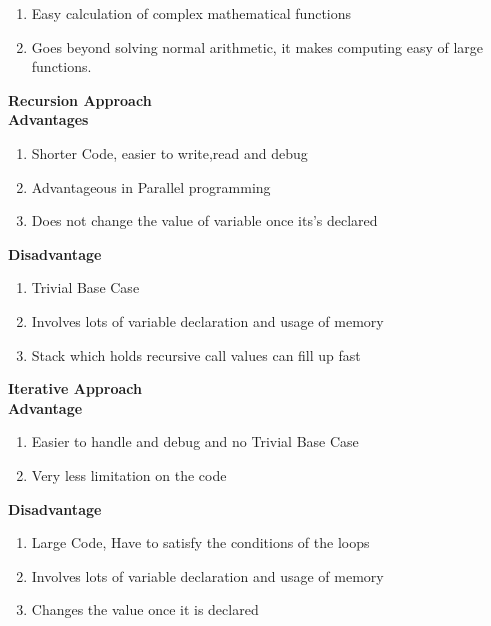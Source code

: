 \documentclass[a4paper, 11pt]{article}
\begin{document}
\begin{enumerate}
    \item Easy calculation of complex mathematical functions
    \item Goes beyond solving normal arithmetic, it makes computing easy of large functions.
\end{enumerate}
\textbf{Recursion Approach}\\ 
\textbf{Advantages}
\begin{enumerate}
    \item  Shorter Code, easier to write,read and debug
    \item  Advantageous in Parallel programming
    \item  Does not change the value of variable once its's declared
\end{enumerate}
\textbf{Disadvantage}
\begin{enumerate}
    \item  Trivial Base Case
    \item  Involves lots of variable declaration and usage of memory
    \item  Stack which holds recursive call values can fill up fast
\end{enumerate}
\newpage
\textbf{Iterative Approach}\\ 
\textbf{Advantage}
\begin{enumerate}
    \item  Easier to handle and debug and no Trivial Base Case
    \item  Very less limitation on the code
\end{enumerate}
\textbf{Disadvantage}
\begin{enumerate}
    \item  Large Code, Have to satisfy the conditions of the loops
    \item  Involves lots of variable declaration and usage of memory
    \item  Changes the value once it is declared
\end{enumerate}
\end{document}
